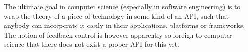 The ultimate goal in computer science (especially in software engineering) is to wrap the theory of a piece of technology in some kind of an API, such that anybody can incorperate it easily in their applications, platforms or frameworks. The notion of feedback control is however apparently so foreign to computer science that there does not exist a proper API for this yet. 